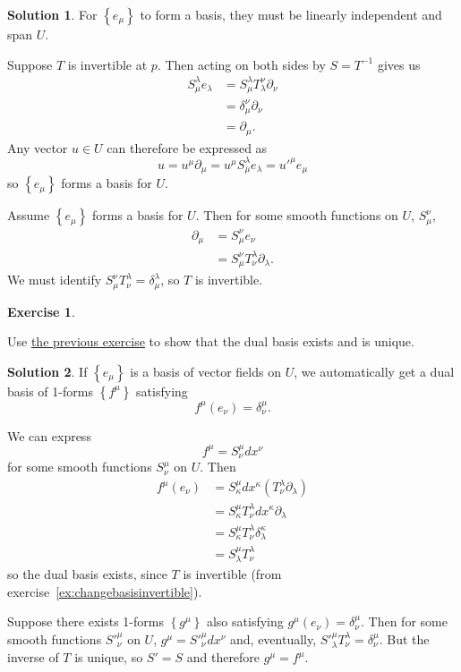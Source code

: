 \documentclass[11pt, a4paper]{report}
\theoremstyle{definition}
\newtheorem{ex}{Exercise}[part]
\newtheorem{sol}{Solution}[part]
\begin{document}
\begin{sol}

For $\left\{e_\mu\right\}$ to form a basis, they must be linearly independent and span $U$.

Suppose $T$ is invertible at $p$. Then acting on both sides by $S = T^{-1}$ gives us
\begin{align*}
    S_\mu^\lambda e_\lambda &= S_\mu^\lambda T_\lambda^\nu \partial_\nu \\
        &= \delta_\mu^\nu \partial_\nu \\
        &= \partial_\mu.
\end{align*}
Any vector $u \in U$ can therefore be expressed as
\[
    u = u^\mu \partial_\mu = u^\mu S_\mu^\lambda e_\lambda = u'^\mu e_\mu
\]
so $\left\{e_\mu\right\}$ forms a basis for $U$.

Assume $\left\{e_\mu\right\}$ forms a basis for $U$. Then for some smooth functions on $U$, $S_\mu^\nu$,
\begin{align*}
    \partial_\mu &= S_\mu^\nu e_\nu \\
                 &= S_\mu^\nu T_\nu^\lambda \partial_\lambda.
\end{align*}
We must identify $S_\mu^\nu T_\nu^\lambda = \delta_\mu^\lambda$, so $T$ is invertible.

\end{sol}

\begin{ex}\label{ex:dualbasisexists}

Use \hyperref[ex:changebasisinvertible]{the previous exercise} to show that the dual basis exists and is unique.

\end{ex}

\begin{sol}

If $\left\{e_\mu\right\}$ is a basis of vector fields on $U$, we automatically get a dual basis of 1-forms $\left\{f^\mu\right\}$ satisfying
\[
    f^\mu(e_\nu) = \delta_\nu^\mu.
\]

We can express
\[
    f^\mu = S_\nu^\mu dx^\nu
\]
for some smooth functions $S_\nu^\mu$ on $U$. Then
\begin{align*}
    f^\mu(e_\nu) &= S_\kappa^\mu dx^\kappa (T_\nu^\lambda \partial_\lambda) \\
                 &= S_\kappa^\mu T_\nu^\lambda dx^\kappa \partial_\lambda \\
                 &= S_\kappa^\mu T_\nu^\lambda \delta_\lambda^\kappa \\
                 &= S_\lambda^\mu T_\nu^\lambda
\end{align*}
so the dual basis exists, since $T$ is invertible (from exercise~\ref{ex:changebasisinvertible}).

Suppose there exists 1-forms $\left\{g^\mu\right\}$ also satisfying $g^\mu(e_\nu) = \delta^\mu_\nu$.
Then for some smooth functions $S'^\mu_\nu$ on $U$, $g^\mu = S'^\mu_\nu dx^\nu$ and, eventually, $S'^\mu_\lambda T^\lambda_\nu = \delta ^\mu_\nu$. But the inverse of $T$ is unique, so $S' = S$ and therefore $g^\mu = f^\mu$.

\end{sol}
\end{document}

